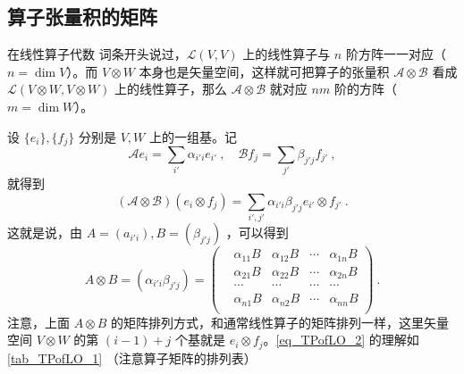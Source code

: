 \subsection{算子张量积的矩阵}
在线性算子代数 词条开头说过，$\mathcal L(V,V)$ 上的线性算子与 $n$ 阶方阵一一对应（ $n=\dim V$）。而 $V\otimes W$ 本身也是矢量空间，这样就可把算子的张量积 $\mathcal A\otimes \mathcal B$ 看成 $\mathcal L(V\otimes W,V\otimes W)$ 上的线性算子，那么 $\mathcal A\otimes \mathcal B$ 就对应 $nm$ 阶的方阵（$m=\dim W$）。

设 $\{e_i\},\{f_j\}$ 分别是 $V,W$ 上的一组基。记
\begin{equation}
\mathcal Ae_i=\sum_{i'}\alpha_{i'i}e_{i'}~,\quad \mathcal Bf_j=\sum_{j'}\beta_{j'j}f_{j'}~,
\end{equation}
就得到
\begin{equation}
(\mathcal A\otimes \mathcal B)(e_i\otimes f_j)=\sum_{i',j'}\alpha_{i'i}\beta_{j'j}e_{i'}\otimes f_{j'}~.
\end{equation}
这就是说，由 $A=(a_{i'i}),B=(\beta_{j'j})$ ，可以得到
\begin{equation}\label{eq_TPofLO_2}
A\otimes B=(\alpha_{i'i}\beta_{j'j})=
\begin{pmatrix}
&\alpha_{11}B&\alpha_{12}B&\cdots&\alpha_{1n}B\\
&\alpha_{21}B&\alpha_{22}B&\cdots&\alpha_{2n}B\\
&\cdots&\cdots&\cdots&\cdots\\
&\alpha_{n1}B&\alpha_{n2}B&\cdots&\alpha_{nn}B\\
\end{pmatrix}~.
\end{equation}
注意，上面 $A\otimes B$ 的矩阵排列方式，和通常线性算子的矩阵排列一样，这里矢量空间 $V\otimes W$ 的第 $(i-1)+j$ 个基就是 $e_i\otimes f_j$。\autoref{eq_TPofLO_2} 的理解如\autoref{tab_TPofLO_1} （注意算子矩阵的排列表）

